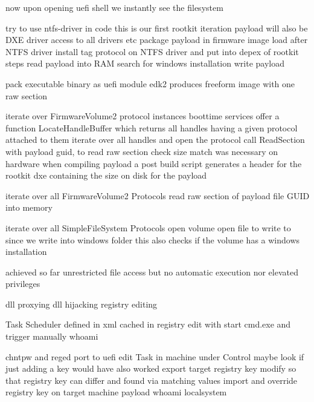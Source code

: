 now upon opening uefi shell
we instantly see the filesystem

try to use ntfs-driver in code
this is our first rootkit iteration
payload will also be DXE driver
access to all drivers etc
package payload in firmware image
load after NTFS driver
install tag protocol on NTFS driver and put into depex of rootkit
steps
read payload into RAM
search for windows installation
write payload

pack executable binary as uefi module
edk2 produces freeform image with one raw section

iterate over FirmwareVolume2 protocol instances
boottime services offer a function LocateHandleBuffer which returns all handles having a given protocol attached to them
iterate over all handles and open the protocol
call ReadSection with payload guid, to read raw section
check size match was necessary on hardware
when compiling payload a post build script generates a header for the rootkit dxe containing the size on disk for the payload

iterate over all FirmwareVolume2 Protocols
read raw section of payload file GUID into memory

iterate over all SimpleFileSystem Protocols
open volume
open file to write to
since we write into windows folder this also checks if the volume has a windows installation

achieved so far unrestricted file access
but no automatic execution nor elevated privileges

dll proxying
dll hijacking
registry editing

Task Scheduler
defined in xml
cached in registry
edit with start cmd.exe and trigger manually
whoami

chntpw and reged
\cite{chntpw}
port to uefi
edit Task in machine under Control
maybe look if just adding a key would have also worked
export target registry key
modify so that registry key can differ and found via matching values
import and override registry key on target machine
payload whoami
localsystem

